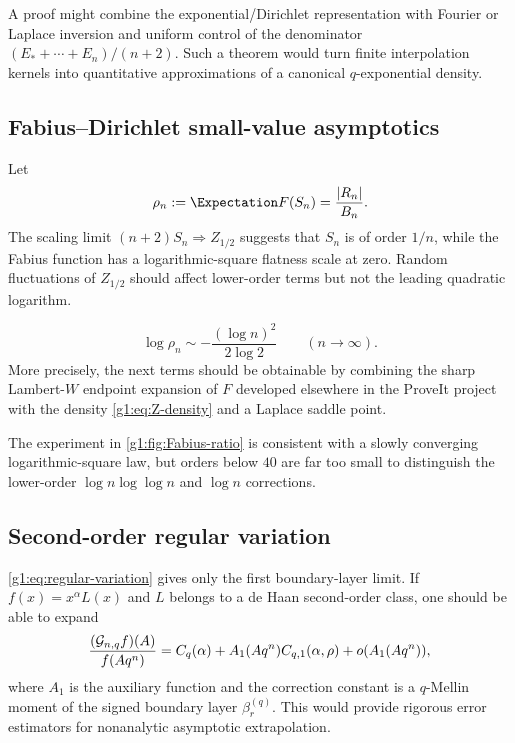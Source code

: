 A proof might combine the exponential/Dirichlet representation with Fourier or
Laplace inversion and uniform control of the denominator
$(E_*+\cdots+E_n)/(n+2)$.  Such a theorem would turn finite interpolation
kernels into quantitative approximations of a canonical $q$-exponential
density.

\subsection{Fabius--Dirichlet small-value asymptotics}

Let
\[
 \rho_n:=\Expectation F(S_n)=\frac{|R_n|}{B_n}.
\]
The scaling limit $(n+2)S_n\Rightarrow Z_{1/2}$ suggests that $S_n$ is of order
$1/n$, while the Fabius function has a logarithmic-square flatness scale at
zero.  Random fluctuations of $Z_{1/2}$ should affect lower-order terms but not
the leading quadratic logarithm.

\begin{conjecture}
\begin{equation}
 \log\rho_n
 \sim-\frac{(\log n)^2}{2\log2}
 \qquad(n\to\infty).
 \label{g1:eq:Fabius-rho-conjecture}
\end{equation}
More precisely, the next terms should be obtainable by combining the sharp
Lambert-$W$ endpoint expansion of $F$ developed elsewhere in the ProveIt
project with the density \eqref{g1:eq:Z-density} and a Laplace saddle point.
\end{conjecture}

The experiment in \cref{g1:fig:Fabius-ratio} is consistent with a slowly
converging logarithmic-square law, but orders below $40$ are far too small to
distinguish the lower-order $\log n\log\log n$ and $\log n$ corrections.

\subsection{Second-order regular variation}

\cref{g1:eq:regular-variation} gives only the first boundary-layer limit.  If
$f(x)=x^\alpha L(x)$ and $L$ belongs to a de Haan second-order class, one should
be able to expand
\[
 \frac{(\mathcal G_{n,q}f)(A)}{f(Aq^n)}
 =C_q(\alpha)+A_1(Aq^n)C_{q,1}(\alpha,\rho)+o(A_1(Aq^n)),
\]
where $A_1$ is the auxiliary function and the correction constant is a
$q$-Mellin moment of the signed boundary layer $\beta_r^{(q)}$.  This would
provide rigorous error estimators for nonanalytic asymptotic extrapolation.

